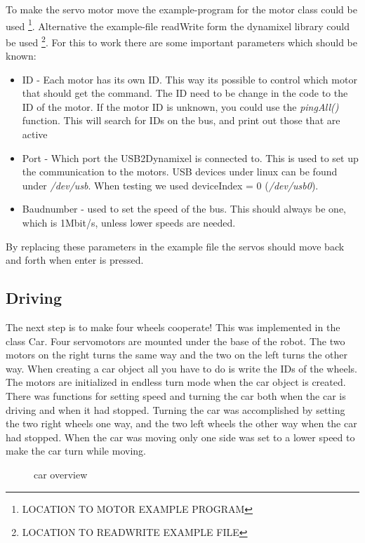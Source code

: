 To make the servo motor move the example-program for the motor class could be used \footnote{LOCATION TO MOTOR EXAMPLE PROGRAM}. Alternative the example-file readWrite form the dynamixel library could be used \footnote{LOCATION TO READWRITE EXAMPLE FILE}. 
For this to work there are some important parameters which should be known:
\begin{itemize}
     \item ID - Each motor has its own ID. This way its possible to control which motor that should get the command. The ID need to be change in the code to the ID of the motor. If the motor ID is unknown, you could use the \textit{pingAll()} function. This will search for IDs on the bus, and print out those that are active
     \item Port - Which port the USB2Dynamixel is connected to. This is used to set up the communication to the motors. USB devices under linux can be found under \textit{/dev/usb}. When testing we used deviceIndex = 0 (\textit{/dev/usb0}).
     \item Baudnumber - used to set the speed of the bus. This should always be one, which is 1Mbit/s, unless lower speeds are needed.
\end{itemize}
\bigskip

By replacing these parameters in the example file the servos should move back and forth when enter is pressed.


\subsection{Driving}
The next step is to make four wheels cooperate!
This was implemented in the class Car. Four servomotors are mounted under the base of the robot. The two motors on the right turns the same way and the two on the left turns the other way. When creating a car object all you have to do is write the IDs of the wheels. The motors are initialized in endless turn mode when the car object is created. There was functions for setting speed and turning the car both when the car is driving and when it had stopped. Turning the car was accomplished by setting the two right wheels one way, and the two left wheels the other way when the car had stopped. When the car was moving only one side was set to a lower speed to make the car turn while moving.


\begin{figure}[H]
    \centering
    \caption{car overview}
    \label{fig:car} 
\end{figure}



